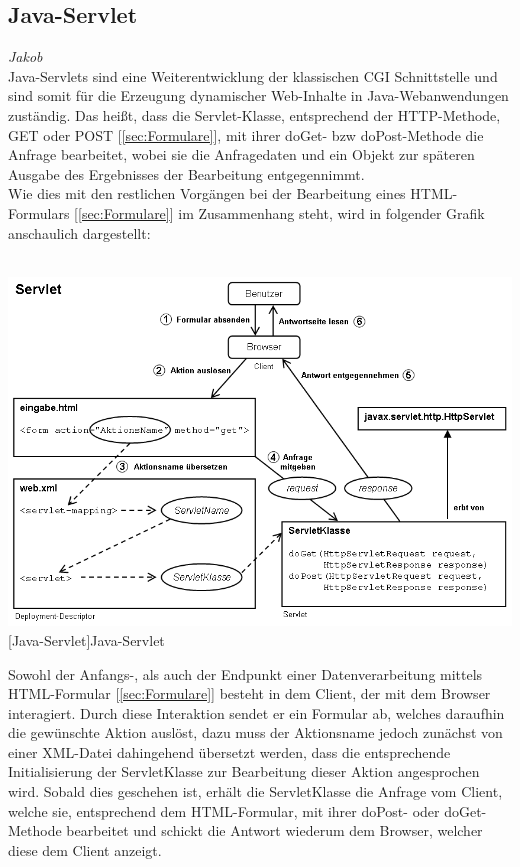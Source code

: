 \documentclass[12pt,a4paper,bibliography=totocnumbered,listof=totocnumbered]{scrartcl}
\begin{document}
\subsection{Java-Servlet}
\label{sec:Java-Servlet}
\emph{Jakob}\\
Java-Servlets sind eine Weiterentwicklung der klassischen CGI Schnittstelle und sind somit für die Erzeugung dynamischer Web-Inhalte in Java-Webanwendungen zuständig.
Das heißt, dass die Servlet-Klasse, entsprechend der HTTP-Methode, GET oder POST [\ref{sec:Formulare}], mit ihrer doGet- bzw doPost-Methode die Anfrage bearbeitet, wobei sie die Anfragedaten und ein Objekt zur späteren Ausgabe des Ergebnisses der Bearbeitung entgegennimmt.\cite{wiki/Servlet}\\
Wie dies mit den restlichen Vorgängen bei der Bearbeitung eines HTML-Formulars [\ref{sec:Formulare}] im Zusammenhang steht, wird in folgender Grafik anschaulich dargestellt:\\
\\
\vspace{1em}
\begin{minipage}{\linewidth}
	\centering
	\includegraphics[width=0.9\linewidth]{Bilder/600px-Servlet.png}
	[Java-Servlet]{Java-Servlet\footnotemark }
	\label{fig:servlet}
\end{minipage}

Sowohl der Anfangs-, als auch der Endpunkt einer Datenverarbeitung mittels HTML-Formular [\ref{sec:Formulare}] besteht in dem Client, der mit dem Browser interagiert. Durch diese Interaktion sendet er ein Formular ab, welches daraufhin die gewünschte Aktion auslöst, dazu muss der Aktionsname jedoch zunächst von einer XML-Datei dahingehend übersetzt werden, dass die entsprechende Initialisierung der ServletKlasse zur Bearbeitung dieser Aktion angesprochen wird.
Sobald dies geschehen ist, erhält die ServletKlasse die Anfrage vom Client, welche sie, entsprechend dem HTML-Formular, mit ihrer doPost- oder doGet-Methode bearbeitet und schickt die Antwort wiederum dem Browser, welcher diese dem Client anzeigt.
\end{document}
